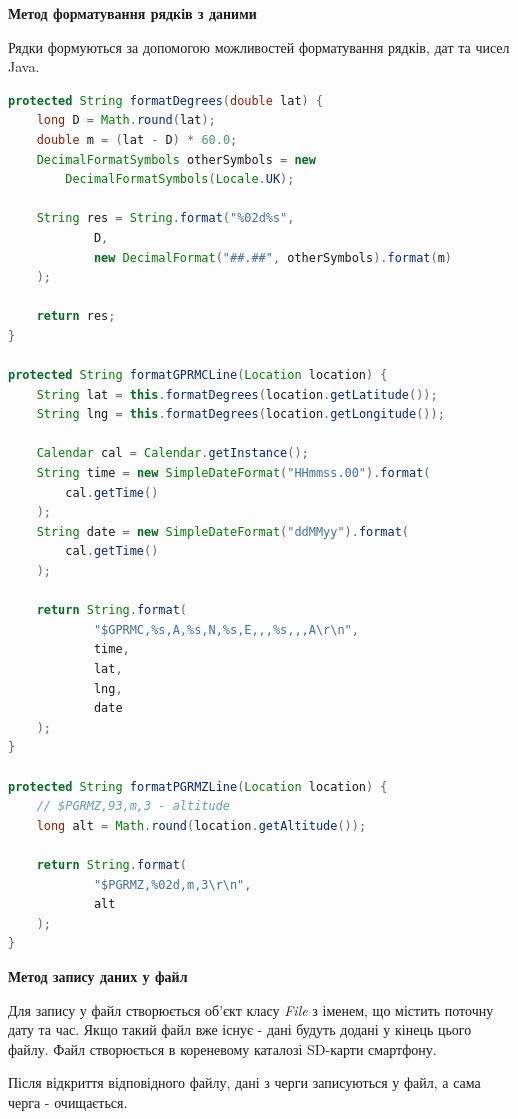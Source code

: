 \documentclass[simple,a4paper,14pt,ukrainian,utf8]{eskdtext}
\begin{document}
        	\textbf{Метод форматування рядків з даними}
        	
        	Рядки формуються за допомогою можливостей форматування рядків, дат та чисел Java.
        	
\begin{lstlisting}[language=Java]
protected String formatDegrees(double lat) {
    long D = Math.round(lat);
    double m = (lat - D) * 60.0;
    DecimalFormatSymbols otherSymbols = new 
    	DecimalFormatSymbols(Locale.UK);

    String res = String.format("%02d%s",
            D,
            new DecimalFormat("##.##", otherSymbols).format(m)
    );

    return res;
}

protected String formatGPRMCLine(Location location) {
    String lat = this.formatDegrees(location.getLatitude());
    String lng = this.formatDegrees(location.getLongitude());

    Calendar cal = Calendar.getInstance();
    String time = new SimpleDateFormat("HHmmss.00").format(
    	cal.getTime()
    );
    String date = new SimpleDateFormat("ddMMyy").format(
    	cal.getTime()
    );

    return String.format(
            "$GPRMC,%s,A,%s,N,%s,E,,,%s,,,A\r\n",
            time,
            lat,
            lng,
            date
    );
}

protected String formatPGRMZLine(Location location) {
    // $PGRMZ,93,m,3 - altitude
    long alt = Math.round(location.getAltitude());

    return String.format(
            "$PGRMZ,%02d,m,3\r\n",
            alt
    );
}
\end{lstlisting}
        	
        	\textbf{Метод запису даних у файл}
        	
        	Для запису у файл створюється об’єкт класу \textit{File} з іменем, що містить поточну дату та час. Якщо такий файл вже існує - дані будуть додані у кінець цього файлу. Файл створюється в кореневому каталозі SD-карти смартфону.
        	
        	Після відкриття відповідного файлу, дані з черги записуються у файл, а сама черга - очищається.
        	
\end{document}
